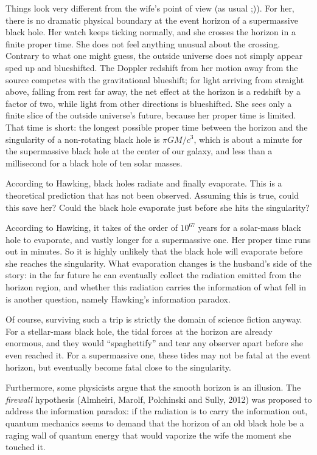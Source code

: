 Things look very different from the wife's point of view (as usual ;)).
For her, there is no dramatic physical boundary at the event horizon of a supermassive black hole.
Her watch keeps ticking normally, and she crosses the horizon in a finite proper time.
She does not feel anything unusual about the crossing.
Contrary to what one might guess, the outside universe does not simply appear sped up and blueshifted.
The Doppler redshift from her motion away from the source competes with the gravitational blueshift; for light arriving from straight above, 
falling from rest far away, the net effect at the horizon is a redshift by a factor of two, while light from other directions is blueshifted.
She sees only a finite slice of the outside universe's future, because her proper time is limited.
That time is short: the longest possible proper time between the horizon and the singularity of a non-rotating black hole is $\pi G M/c^3$, 
which is about a minute for the supermassive black hole at the center of our galaxy, and less than a millisecond for a black hole of ten solar masses.

According to Hawking, black holes radiate and finally evaporate. This is a theoretical prediction that has not been observed. Assuming this is true, could this save her?
Could the black hole evaporate just before she hits the singularity?

According to Hawking, it takes of the order of $10^{67}$ years for a solar-mass black hole to evaporate, and vastly longer for a supermassive one.
Her proper time runs out in minutes. So it is highly unlikely that the black hole will evaporate before she reaches the singularity.
What evaporation changes is the husband's side of the story: in the far future he can eventually collect the radiation emitted from the horizon region, 
and whether this radiation carries the information of what fell in is another question, namely Hawking's information paradox.

Of course, surviving such a trip is strictly the domain of science fiction anyway.
For a stellar-mass black hole, the tidal forces at the horizon are already enormous, and they would ``spaghettify'' and tear any observer apart before she even reached it.
For a supermassive one, these tides may not be fatal at the event horizon, but eventually become fatal close to the singularity.

Furthermore, some physicists argue that the smooth horizon is an illusion.
The \emph{firewall} hypothesis (Almheiri, Marolf, Polchinski and Sully, 2012) was proposed to address the information paradox: 
if the radiation is to carry the information out, quantum mechanics seems to demand that the horizon of an old black hole be a 
raging wall of quantum energy that would vaporize the wife the moment she touched it.

